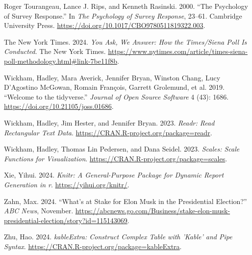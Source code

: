 \documentclass[
  letterpaper,
  DIV=11,
  numbers=noendperiod]{scrartcl}
\newlength{\cslhangindent}
\newlength{\cslentryspacingunit} %
\newenvironment{CSLReferences}[2] %
 {%
  \setlength{\parindent}{0pt}
  \ifodd #1
  \let\oldpar\par
  \def\par{\hangindent=\cslhangindent\oldpar}
  \fi
  \setlength{\parskip}{#2\cslentryspacingunit}
 }%
 {}
\begin{document}
\begin{CSLReferences}{1}{0}
\leavevmode{}%
Roger Tourangeau, Lance J. Rips, and Kenneth Rasinski. 2000. {``The
Psychology of Survey Response.''} In \emph{The Psychology of Survey
Response}, 23--61. Cambridge University Press.
\url{https://doi.org/10.1017/CBO9780511819322.003}.

\leavevmode{}%
The New York Times. 2024. \emph{You Ask, We Answer: How the Times/Siena
Poll Is Conducted}. The New York Times.
\url{https://www.nytimes.com/article/times-siena-poll-methodology.html\#link-7be11f8b}.

\leavevmode{}%
Wickham, Hadley, Mara Averick, Jennifer Bryan, Winston Chang, Lucy
D'Agostino McGowan, Romain François, Garrett Grolemund, et al. 2019.
{``Welcome to the {tidyverse}.''} \emph{Journal of Open Source Software}
4 (43): 1686. \url{https://doi.org/10.21105/joss.01686}.

\leavevmode{}%
Wickham, Hadley, Jim Hester, and Jennifer Bryan. 2023. \emph{Readr: Read
Rectangular Text Data}. \url{https://CRAN.R-project.org/package=readr}.

\leavevmode{}%
Wickham, Hadley, Thomas Lin Pedersen, and Dana Seidel. 2023.
\emph{Scales: Scale Functions for Visualization}.
\url{https://CRAN.R-project.org/package=scales}.

\leavevmode{}%
Xie, Yihui. 2024. \emph{Knitr: A General-Purpose Package for Dynamic
Report Generation in r}. \url{https://yihui.org/knitr/}.

\leavevmode{}%
Zahn, Max. 2024. {``What's at Stake for Elon Musk in the Presidential
Election?''} \emph{ABC News}, November.
\url{https://abcnews.go.com/Business/stake-elon-musk-presidential-election/story?id=115143069}.

\leavevmode{}%
Zhu, Hao. 2024. \emph{kableExtra: Construct Complex Table with 'Kable'
and Pipe Syntax}. \url{https://CRAN.R-project.org/package=kableExtra}.

\end{CSLReferences}
\end{document}
